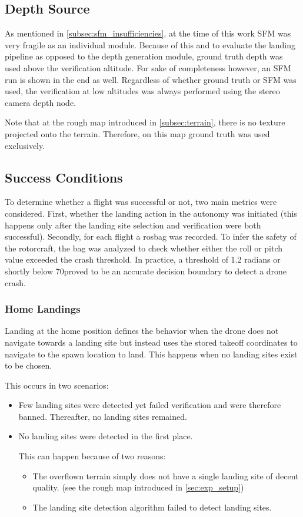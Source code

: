 \subsection{Depth Source}
As mentioned in \cref{subsec:sfm_insufficiencies}, at the time of this work SFM was very fragile as an individual module. Because of this and to evaluate the landing pipeline as opposed to the depth generation module, ground truth depth was used above the verification altitude. For sake of completeness however, an SFM run is shown in the end as well. Regardless of whether ground truth or SFM was used, the verification at low altitudes was always performed using the stereo camera depth node.

Note that at the rough map introduced in \cref{subsec:terrain}, there is no texture projected onto the terrain. Therefore, on this map ground truth was used exclusively.

\subsection{Success Conditions}
To determine whether a flight was successful or not, two main metrics were considered. First, whether the landing action in the autonomy was initiated (this happens only after the landing site selection and verification were both successful).
Secondly, for each flight a rosbag was recorded. To infer the safety of the rotorcraft, the bag was analyzed to check whether either the roll or pitch value exceeded the crash threshold. In practice, a threshold of 1.2 radians or shortly below 70\degree proved to be an accurate decision boundary to detect a drone crash.

\subsubsection{Home Landings}
Landing at the home position defines the behavior when the drone does not navigate towards a landing site but instead uses the stored takeoff coordinates to navigate to the spawn location to land. This happens when no landing sites exist to be chosen.

This occurs in two scenarios:
\begin{itemize}
    \item Few landing sites were detected yet failed verification and were therefore banned. Thereafter, no landing sites remained.
    \item No landing sites were detected in the first place. 

    This can happen because of two reasons:
    \begin{itemize}
        \item The overflown terrain simply does not have a single landing site of decent quality. (see the rough map introduced in \cref{sec:exp_setup})
        \item The landing site detection algorithm failed to detect landing sites.
    \end{itemize}
\end{itemize}
    
